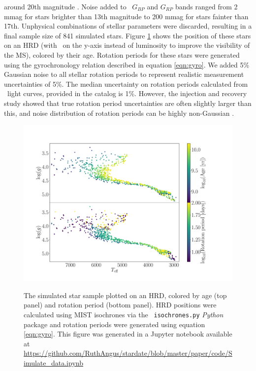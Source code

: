 around 20th magnitude \citep{evans2017, brown2018}.
Noise added to \gaia\ $G_{BP}$ and $G_{RP}$ bands ranged from 2 mmag for stars
brighter than 13th magnitude to 200 mmag for stars fainter than 17th.
Unphysical combinations of stellar parameters were discarded, resulting in a
final sample size of 841 simulated stars.
Figure \ref{fig:CMD_age} shows the position of these stars on an HRD
(with \logg\ on the y-axis instead of luminosity to improve the visibility of
the MS), colored by their age.
Rotation periods for these stars were generated using the gyrochronology
relation described in equation \ref{eqn:gyro}.
We added 5\% Gaussian noise to all stellar rotation periods to represent
realistic measurement uncertainties of 5\%.
The median uncertainty on rotation periods calculated from \kepler\ light
curves, provided in the \citet{mcquillan2014} catalog is 1\%.
However, the \citet{aigrain2015} injection and recovery study showed that true
rotation period uncertainties are often slightly larger than this, and noise
distribution of rotation periods can be highly non-Gaussian
\citep[\eg][]{aigrain2015, angus2018}.
\begin{figure}
  \caption{
      The simulated star sample plotted on an HRD, colored by age
    (top panel) and rotation period (bottom panel).
    HRD positions were calculated using MIST isochrones via the {\tt
    isochrones.py} {\it Python} package and rotation periods were generated
    using equation \ref{eqn:gyro}.
    This figure was generated in a Jupyter notebook available at
    \url{https://github.com/RuthAngus/stardate/blob/master/paper/code/Simulate_data.ipynb}
}
  \centering
    \includegraphics[width=1\textwidth]{simulated_CMD}
\label{fig:CMD_age}
\end{figure}
